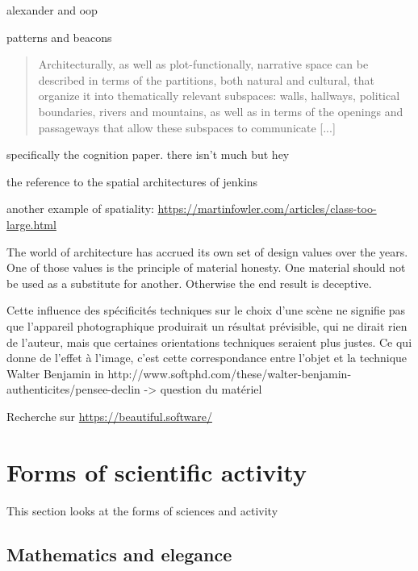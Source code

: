 
alexander and oop

patterns and beacons

\begin{quote}
    Architecturally, as well as plot-functionally, narrative space can be described in terms of the partitions, both natural and cultural, that organize it into thematically relevant subspaces: walls, hallways, political boundaries, rivers and mountains, as well as in terms of the openings and passageways that allow these subspaces to communicate [...] \citep{ryan_space_2009}
\end{quote}


specifically the cognition paper. there isn't much but hey

the reference to the spatial architectures of jenkins

another example of spatiality: \url{https://martinfowler.com/articles/class-too-large.html}


The world of architecture has accrued its own set of design values over the years. One of those values is the principle of material honesty. One material should not be used as a substitute for another. Otherwise the end result is deceptive.\citep{keith_resilient_2016}

Cette influence des spécificités techniques sur le choix d'une scène ne signifie pas que l'appareil photographique produirait un résultat prévisible, qui ne dirait rien de l'auteur, mais que certaines orientations techniques seraient plus justes. Ce qui donne de l'effet à l'image, c'est cette correspondance entre l'objet et la technique Walter Benjamin in http://www.softphd.com/these/walter-benjamin-authenticites/pensee-declin -> question du matériel

Recherche sur \url{https://beautiful.software/}


\section{Forms of scientific activity}
\label{sec:aesthetic-scientific}

This section looks at the forms of sciences and activity


\subsection{Mathematics and elegance}
\label{subsec:aesthetic-mathematics}


